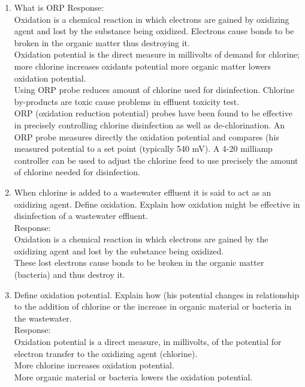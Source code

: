 \begin{enumerate}
\begin{enumerate}[label=\alph*]
\begin{itemize}
\end{itemize}
\end{enumerate}
\item What is ORP
\vspace{0.3cm}
Response:\\
\vspace{0.3cm}
Oxidation is a chemical reaction in which electrons are gained by oxidizing agent and lost by the substance being oxidized.  Electrons cause bonds to be broken in the organic matter thus destroying it.\\
\vspace{0.5cm}
Oxidation potential is the direct measure in millivolts of demand for chlorine; more chlorine increases oxidants potential more organic matter lowers oxidation potential.\\
Using ORP probe reduces amount of chlorine used for disinfection.  Chlorine by-products are toxic cause problems in effluent toxicity test.\\
\vspace{0.5cm}
ORP (oxidation red\vspace{0.5cm}uction potential) probes have been found to be effective in precisely controlling chlorine disinfection as well as de-chlorination.   An ORP probe measures directly the oxidation potential and compares (his measured potential to a set point (typically 540 mV).  A 4-20 milliamp controller can be used to adjust the chlorine feed to use precisely the amount of chlorine needed for disinfection. 


\item  When chlorine is added to a wastewater effluent it is said to act as an oxidizing agent.  Define oxidation.  Explain how oxidation might be effective in disinfection of a wastewater effluent.\\
\vspace{0.3cm}
Response:\\
\vspace{0.3cm}
Oxidation is a chemical reaction in which electrons are gained by the oxidizing agent and lost by the substance being oxidized.\\
These lost electrons cause bonds to be broken in the organic matter (bacteria) and thus destroy it.
\\
\item Define oxidation potential.   Explain how (his potential changes in relationship to the addition of chlorine or the increase in organic material or bacteria in the wastewater.  
\\
\vspace{0.3cm}
Response:\\
\vspace{0.3cm}Oxidation potential is a direct measure, in millivolts, of the potential for electron transfer to the oxidizing agent (chlorine).  \\
More chlorine increases oxidation potential.  \\
More organic material or bacteria lowers the oxidation potential.\\


\end{enumerate}

